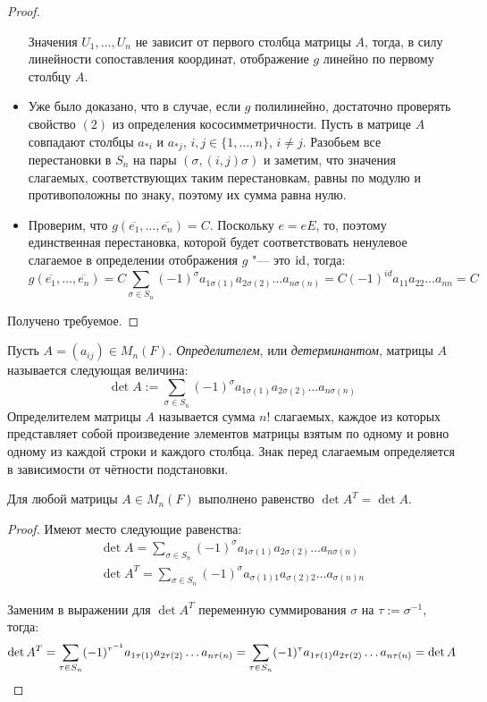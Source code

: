 \begin{proof}
\begin{itemize}
		Значения $U_1, \dotsc, U_n$ не зависит от первого столбца матрицы $A$, тогда, в силу линейности сопоставления координат, отображение $g$ линейно по первому столбцу $A$.
		
		\item Уже было доказано, что в случае, если $g$ полилинейно, достаточно проверять свойство $(2)$ из определения кососимметричности. Пусть в матрице $A$ совпадают столбцы $a_{*i}$ и $a_{*j}$, $i, j \in \{1, \dotsc, n\}$, $i \ne j$. Разобьем все перестановки в $S_n$ на пары $(\sigma, (i,j)\sigma)$ и заметим, что значения слагаемых, соответствующих таким перестановкам, равны по модулю и противоположны по знаку, поэтому их сумма равна нулю.
		
		\item Проверим, что $g(\overline{e_1}, \dotsc, \overline{e_n}) = C$. Поскольку $e = eE$, то, поэтому единственная перестановка, которой будет соответствовать ненулевое слагаемое в определении отображения $g$ "--- это $\mathrm{id}$, тогда:
		\[g(\overline{e_1}, \dots, \overline{e_n}) = C\sum_{\sigma \in S_n}(-1)^\sigma a_{1 \sigma(1)}a_{2 \sigma(2)}\dots a_{n \sigma(n)} = C(-1)^{id}a_{11}a_{22}\dots a_{nn} = C\]
	\end{itemize}
	
	Получено требуемое.
\end{proof}
    
    \begin{definition}
    	Пусть $A = (a_{ij}) \in M_n(F)$. \textit{Определителем}, или \textit{детерминантом}, матрицы $A$ называется следующая величина:
    	\[\det{A} := \sum_{\sigma \in S_n}(-1)^\sigma a_{1 \sigma(1)}a_{2 \sigma(2)}\dots a_{n \sigma(n)}\]
        Определителем матрицы $A$ называется сумма $n!$ слагаемых, каждое из которых представляет собой произведение элементов матрицы взятым по одному и ровно одному из каждой строки и каждого столбца. Знак перед слагаемым определяется в зависимости от чётности подстановки.
    \end{definition}
    
    \begin{theorem}
    	Для любой матрицы $A \in M_n(F)$ выполнено равенство $\det{A^T} = \det{A}$.
    \end{theorem}
    
    \begin{proof}
    	Имеют место следующие равенства:
    	\begin{gather*}
    		\det{A} = \sum_{\sigma \in S_n}(-1)^\sigma a_{1\sigma(1)}a_{2\sigma(2)}\dots a_{n\sigma(n)}\\
    		\det{A^T} = \sum_{\sigma \in S_n}(-1)^\sigma a_{\sigma(1)1}a_{\sigma(2)2}\dots a_{\sigma(n)n}
    	\end{gather*}
    	
    	Заменим в выражении для $\det{A^T}$ переменную суммирования $\sigma$ на $\tau := \sigma^{-1}$, тогда:
    	\[\det{A^T} = \sum_{\tau \in S_n}(-1)^{\tau^{-1}} a_{1\tau(1)}a_{2\tau(2)}\dots a_{n\tau(n)} = \sum_{\tau \in S_n}(-1)^{\tau} a_{1\tau(1)}a_{2\tau(2)}\dots a_{n\tau(n)} = \det A\qedhere\]
    \end{proof}
    

